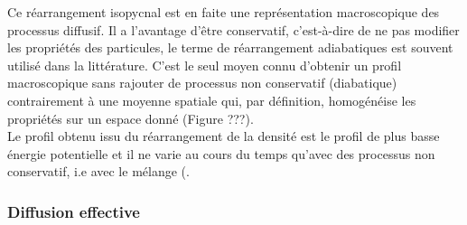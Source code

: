 \documentclass[a4paper,12pt]{article}
\begin{document}
        Ce réarrangement isopycnal est en faite une représentation macroscopique des processus diffusif. Il a l'avantage d'être conservatif, c'est-à-dire de ne pas modifier les propriétés des particules, le terme de réarrangement adiabatiques est souvent utilisé dans la littérature. C'est le seul moyen connu d'obtenir un profil macroscopique sans rajouter de processus non conservatif (diabatique) contrairement à une moyenne spatiale qui, par définition, homogénéise les propriétés sur un espace donné (Figure ???). \\
        Le profil obtenu issu du réarrangement de la densité est le profil de plus basse énergie potentielle et il ne varie au cours du temps qu'avec des processus non conservatif, i.e avec le mélange (\cite*{winters_diascalar_1996}.
        
        \subsubsection{Diffusion effective}
        
\end{document}
